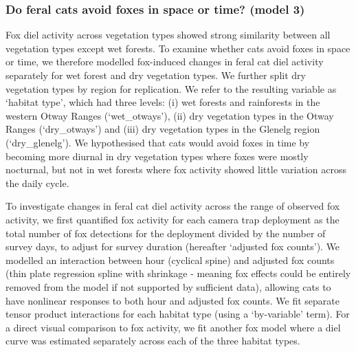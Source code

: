\documentclass[]{elsarticle} %
\begin{document}
\hypertarget{do-feral-cats-avoid-foxes-in-space-or-time-model-3}{%
\subsubsection{Do feral cats avoid foxes in space or time? (model 3)}\label{do-feral-cats-avoid-foxes-in-space-or-time-model-3}}

Fox diel activity across vegetation types showed strong similarity between all vegetation types except wet forests. To examine whether cats avoid foxes in space or time, we therefore modelled fox-induced changes in feral cat diel activity separately for wet forest and dry vegetation types. We further split dry vegetation types by region for replication. We refer to the resulting variable as `habitat type', which had three levels: (i) wet forests and rainforests in the western Otway Ranges (`wet\_otways'), (ii) dry vegetation types in the Otway Ranges (`dry\_otways') and (iii) dry vegetation types in the Glenelg region (`dry\_glenelg'). We hypothesised that cats would avoid foxes in time by becoming more diurnal in dry vegetation types where foxes were mostly nocturnal, but not in wet forests where fox activity showed little variation across the daily cycle.

To investigate changes in feral cat diel activity across the range of observed fox activity, we first quantified fox activity for each camera trap deployment as the total number of fox detections for the deployment divided by the number of survey days, to adjust for survey duration (hereafter `adjusted fox counts'). We modelled an interaction between hour (cyclical spine) and adjusted fox counts (thin plate regression spline with shrinkage - meaning fox effects could be entirely removed from the model if not supported by sufficient data), allowing cats to have nonlinear responses to both hour and adjusted fox counts. We fit separate tensor product interactions for each habitat type (using a `by-variable' term). For a direct visual comparison to fox activity, we fit another fox model where a diel curve was estimated separately across each of the three habitat types.

\newpage
\end{document}
